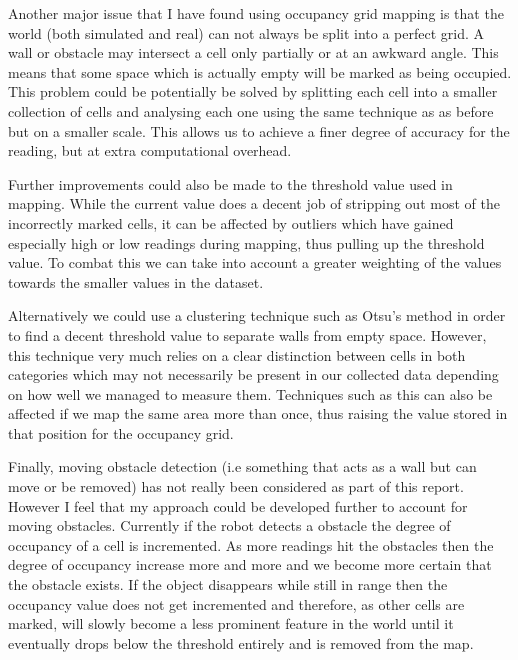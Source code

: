 \documentclass{article}
\begin{document}
Another major issue that I have found using occupancy grid mapping is that the world (both simulated and real) can not always be split into a perfect grid. A wall or obstacle may intersect a cell only partially or at an awkward angle. This means that some space which is actually empty will be marked as being occupied. This problem could be potentially be solved by splitting each cell into a smaller collection of cells and analysing each one using the same technique as as before but on a smaller scale. This allows us to achieve a finer degree of accuracy for the reading, but at extra computational overhead.

Further improvements could also be made to the threshold value used in mapping. While the current value does a decent job of stripping out most of the incorrectly marked cells, it can be affected by outliers which have gained especially high or low readings during mapping, thus pulling up the threshold value. To combat this we can take into account a greater weighting of the values towards the smaller values in the dataset.

Alternatively we could use a clustering technique such as Otsu's method in order to find a decent threshold value to separate walls from empty space. However, this technique very much relies on a clear distinction between cells in both categories which may not necessarily be present in our collected data depending on how well we managed to measure them. Techniques such as this can also be affected if we map the same area more than once, thus raising the value stored in that position for the occupancy grid.

Finally, moving obstacle detection (i.e something that acts as a wall but can move or be removed) has not really been considered as part of this report. However I feel that my approach could be developed further to account for moving obstacles. Currently if the robot detects a obstacle the degree of occupancy of a cell is incremented. As more readings hit the obstacles then the degree of occupancy increase more and more and we become more certain that the obstacle exists. If the object disappears while still in range then the occupancy value does not get incremented and therefore, as other cells are marked, will slowly become a less prominent feature in the world until it eventually drops below the threshold entirely and is removed from the map.
\end{document}
